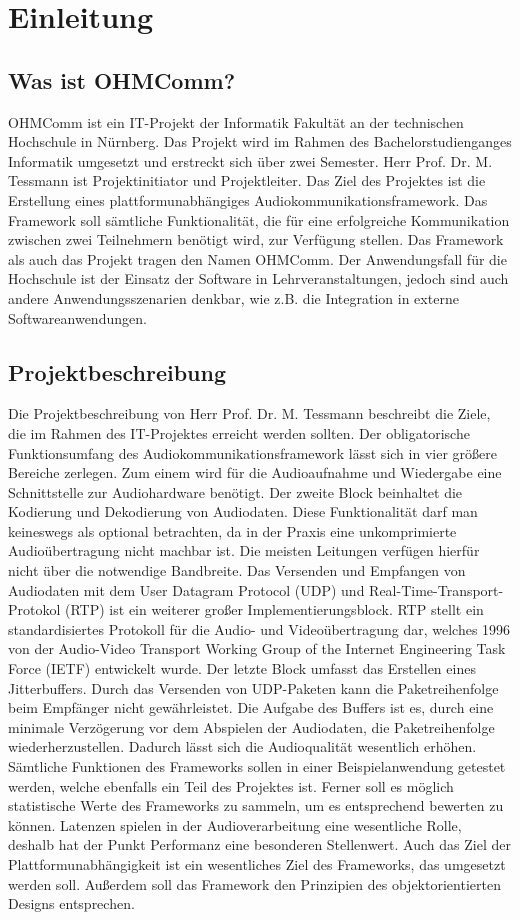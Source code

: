 \chapter{Einleitung}
\section{Was ist OHMComm?}
OHMComm ist ein IT-Projekt der Informatik Fakultät an der technischen Hochschule in Nürnberg. Das Projekt wird im Rahmen des Bachelorstudienganges Informatik umgesetzt und erstreckt sich über zwei Semester. Herr Prof. Dr. M. Tessmann ist Projektinitiator und Projektleiter. Das Ziel des Projektes ist die Erstellung eines plattformunabhängiges Audiokommunikationsframework. Das Framework soll sämtliche Funktionalität, die für eine erfolgreiche Kommunikation zwischen zwei Teilnehmern benötigt wird, zur Verfügung stellen. Das Framework als auch das Projekt tragen den Namen OHMComm. Der Anwendungsfall für die Hochschule ist der Einsatz der Software in Lehrveranstaltungen, jedoch sind auch andere Anwendungsszenarien denkbar, wie z.B. die Integration in externe Softwareanwendungen.

\section{Projektbeschreibung}
Die Projektbeschreibung von Herr Prof. Dr. M. Tessmann beschreibt die Ziele, die im Rahmen des IT-Projektes erreicht werden sollten. Der obligatorische Funktionsumfang des Audiokommunikationsframework lässt sich in vier größere Bereiche zerlegen. Zum einem wird für die Audioaufnahme und Wiedergabe eine Schnittstelle zur Audiohardware benötigt. Der zweite Block beinhaltet die Kodierung und Dekodierung von Audiodaten. Diese Funktionalität darf man keineswegs als optional betrachten, da in der Praxis eine unkomprimierte Audioübertragung nicht machbar ist. Die meisten Leitungen verfügen hierfür nicht über die notwendige Bandbreite. Das Versenden und Empfangen von Audiodaten mit dem User Datagram Protocol (UDP) und Real-Time-Transport-Protokol (RTP) ist ein weiterer großer Implementierungsblock. RTP stellt ein standardisiertes Protokoll für die Audio- und Videoübertragung dar, welches 1996 von der Audio-Video Transport Working Group of the Internet Engineering Task Force (IETF) entwickelt wurde. Der letzte Block umfasst das Erstellen eines Jitterbuffers. Durch das Versenden von UDP-Paketen kann die Paketreihenfolge beim Empfänger nicht gewährleistet. Die Aufgabe des Buffers ist es, durch eine minimale Verzögerung vor dem Abspielen der Audiodaten, die Paketreihenfolge wiederherzustellen. Dadurch lässt sich die Audioqualität wesentlich erhöhen. Sämtliche Funktionen des Frameworks sollen in einer Beispielanwendung getestet werden, welche ebenfalls ein Teil des Projektes ist. Ferner soll es möglich statistische Werte des Frameworks zu sammeln, um es entsprechend bewerten zu können. Latenzen spielen in der Audioverarbeitung eine wesentliche Rolle, deshalb hat der Punkt Performanz eine besonderen Stellenwert. Auch das Ziel der Plattformunabhängigkeit ist ein wesentliches Ziel des Frameworks, das umgesetzt werden soll. Außerdem soll das Framework den Prinzipien des objektorientierten Designs entsprechen.
	
